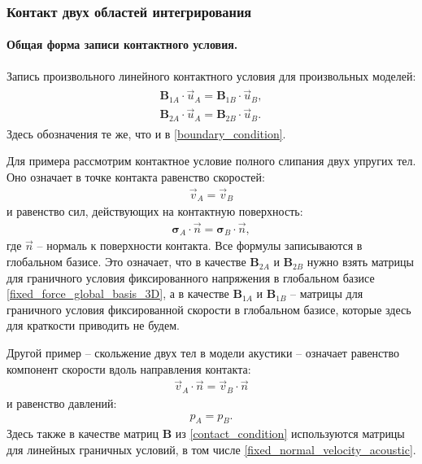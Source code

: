 \documentclass[a4paper]{article}
\numberwithin{equation}{section}
\begin{document}
\subsubsection{Контакт двух областей интегрирования}
\paragraph{Общая форма записи контактного условия.}
Запись произвольного линейного контактного условия для произвольных моделей:
\begin{eqnarray}
\label{contact_condition}
\begin{split}
	\mathbf{B}_{1A} \cdot \vec{u}_A = \mathbf{B}_{1B} \cdot \vec{u}_B, \\
	\mathbf{B}_{2A} \cdot \vec{u}_A = \mathbf{B}_{2B} \cdot \vec{u}_B.
\end{split}
\end{eqnarray}
Здесь обозначения те же, что и в \eqref{boundary_condition}.

Для примера рассмотрим контактное условие полного слипания двух упругих тел.
Оно означает в точке контакта равенство скоростей:
\begin{eqnarray}
\vec{v}_A = \vec{v}_B
\end{eqnarray}
и равенство сил, действующих на контактную поверхность:
\begin{eqnarray}
\mathbf{\sigma}_A \cdot \vec{n} = \mathbf{\sigma}_B \cdot \vec{n},
\end{eqnarray}
где $\vec{n}$ -- нормаль к поверхности контакта. 
Все формулы записываются в глобальном базисе. 
Это означает, что в качестве $\mathbf{B}_{2A}$ и $\mathbf{B}_{2B}$ 
нужно взять матрицы для граничного условия фиксированного напряжения в глобальном базисе 
\eqref{fixed_force_global_basis_3D}, а в качестве 
$\mathbf{B}_{1A}$ и $\mathbf{B}_{1B}$ -- матрицы для граничного условия 
фиксированной скорости в глобальном базисе, 
которые здесь для краткости приводить не будем.

Другой пример -- скольжение двух тел в модели акустики -- 
означает равенство компонент скорости вдоль направления контакта:
\begin{eqnarray}
\vec{v}_A \cdot \vec{n} = \vec{v}_B \cdot \vec{n}
\end{eqnarray}
и равенство давлений:
\begin{eqnarray}
p_A = p_B.
\end{eqnarray}
Здесь также в качестве матриц $\mathbf{B}$ из \eqref{contact_condition} 
используются матрицы для линейных граничных условий, в том числе 
\eqref{fixed_normal_velocity_acoustic}.
\end{document}
